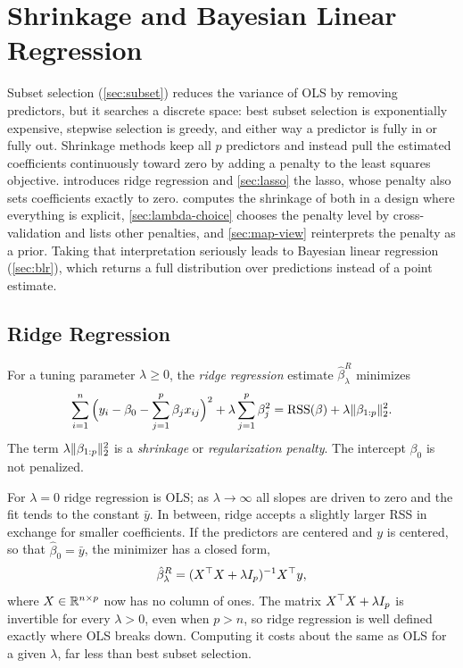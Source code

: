 \chapter{Shrinkage and Bayesian Linear Regression}\label{ch:shrinkage}

Subset selection (\cref{sec:subset}) reduces the variance of OLS by removing predictors, but it searches a discrete space: best subset selection is exponentially expensive, stepwise selection is greedy, and either way a predictor is fully in or fully out. Shrinkage methods keep all $p$ predictors and instead pull the estimated coefficients continuously toward zero by adding a penalty to the least squares objective.  introduces ridge regression and \cref{sec:lasso} the lasso, whose penalty also sets coefficients exactly to zero.  computes the shrinkage of both in a design where everything is explicit, \cref{sec:lambda-choice} chooses the penalty level by cross-validation and lists other penalties, and \cref{sec:map-view} reinterprets the penalty as a prior. Taking that interpretation seriously leads to Bayesian linear regression (\cref{sec:blr}), which returns a full distribution over predictions instead of a point estimate.

\section{Ridge Regression}\label{sec:ridge}

\begin{definition}\label{def:ridge}
For a tuning parameter $\lambda\ge0$, the \emph{ridge regression} estimate $\hat\beta^R_\lambda$ minimizes
\[
\sum_{i=1}^n\Big(y_i-\beta_0-\sum_{j=1}^p\beta_jx_{ij}\Big)^2+\lambda\sum_{j=1}^p\beta_j^2=\mathrm{RSS}(\beta)+\lambda\lVert \beta_{1:p}\rVert_2^2 .
\]
The term $\lambda\lVert \beta_{1:p}\rVert_2^2$ is a \emph{shrinkage} or \emph{regularization penalty}. The intercept $\beta_0$ is not penalized.
\end{definition}

For $\lambda=0$ ridge regression is OLS; as $\lambda\to\infty$ all slopes are driven to zero and the fit tends to the constant $\bar y$. In between, ridge accepts a slightly larger RSS in exchange for smaller coefficients. If the predictors are centered and $y$ is centered, so that $\hat\beta_0=\bar y$, the minimizer has a closed form,
\[
\hat\beta^R_\lambda=(X^{\top} X+\lambda I_p)^{-1}X^{\top} y,
\]
where $X\in\mathbb{R}^{n\times p}$ now has no column of ones. The matrix $X^{\top} X+\lambda I_p$ is invertible for every $\lambda>0$, even when $p>n$, so ridge regression is well defined exactly where OLS breaks down. Computing it costs about the same as OLS for a given $\lambda$, far less than best subset selection.


